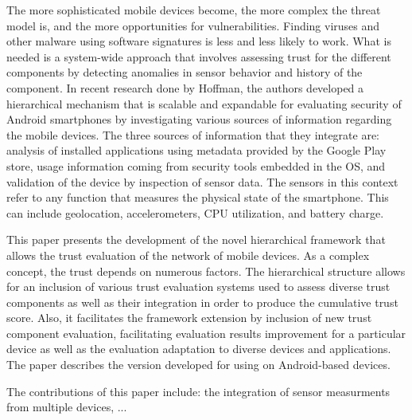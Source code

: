The more sophisticated mobile devices become, the more complex the threat model is, and the more opportunities
for vulnerabilities.  Finding viruses and other malware using software signatures is less and less likely to
work.  What is needed is a system-wide  approach that involves assessing trust for the different
components by detecting anomalies in sensor behavior and history of the component.  
In recent research done by Hoffman,  the authors developed a hierarchical 
mechanism that is scalable and expandable for evaluating security of
Android smartphones by investigating various sources of information regarding 
the mobile devices. 
%
The three sources of information that they integrate are:
analysis of installed applications using metadata provided by the Google Play store,
usage information coming from security tools embedded in the OS, and 
validation of the device by inspection of sensor data.  
The sensors in this context refer to any function that
measures the physical state of the smartphone.  This can include geolocation, accelerometers, CPU 
utilization, and battery charge.


This paper presents the development of the novel hierarchical framework that allows the trust evaluation of the network of 
mobile devices. As a complex concept, the trust depends on numerous factors. The hierarchical structure allows for an 
inclusion of various trust evaluation systems used to assess diverse trust components as well as their integration in 
order to produce the cumulative trust score. Also, it facilitates the framework extension by inclusion of new trust 
component evaluation, facilitating evaluation results improvement for a particular device as well as the evaluation adaptation to diverse devices and applications. The paper describes the version developed for using on Android-based devices.

The contributions of this paper include: 
the integration of sensor measurments from multiple devices, ...

